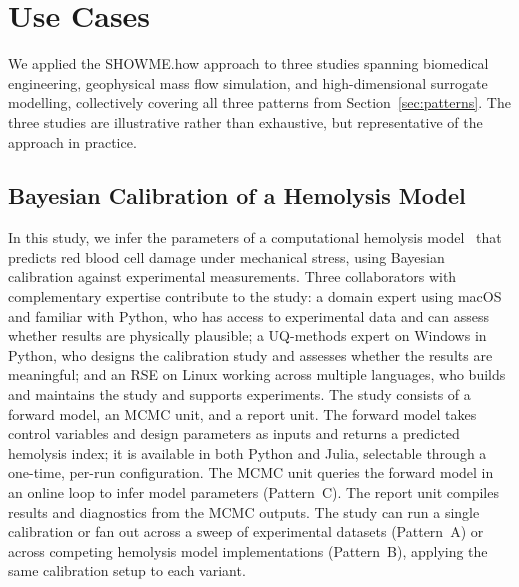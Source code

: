 \documentclass{eceasst}
\begin{document}
\section{Use Cases}
\label{sec:usecases}

We applied the SHOWME.how approach to three studies spanning biomedical
engineering, geophysical mass flow simulation, and high-dimensional surrogate
modelling, collectively covering all three patterns from
Section~\ref{sec:patterns}. The three studies are illustrative rather than
exhaustive, but representative of the approach in practice.

\subsection{Bayesian Calibration of a Hemolysis Model}
\label{sec:usecase:hemolysis}

In this study, we infer the parameters of a computational hemolysis model~\cite{dirkes2026hemolysis} that
predicts red blood cell damage under mechanical stress, using Bayesian
calibration against experimental measurements.
Three collaborators with complementary expertise contribute to the study: a
domain expert using macOS and familiar with Python, who has access to
experimental data and can assess whether results are physically plausible; a
UQ-methods expert on Windows in Python, who designs the calibration study and
assesses whether the results are meaningful; and an RSE on Linux working across
multiple languages, who builds and maintains the study and supports experiments.
The study consists of a forward model, an MCMC unit, and a report unit.
The forward model
takes control variables and design parameters as inputs and returns a predicted
hemolysis index; it is available in both Python and Julia, selectable through a one-time, 
per-run configuration. The MCMC unit queries the forward model in an online loop to infer
model parameters (Pattern~C). The report unit compiles results and diagnostics from the
MCMC outputs. The study can run a single calibration or fan out across a sweep of
experimental datasets (Pattern~A) or across competing hemolysis model
implementations (Pattern~B), applying the same calibration setup to each
variant.
\end{document}
